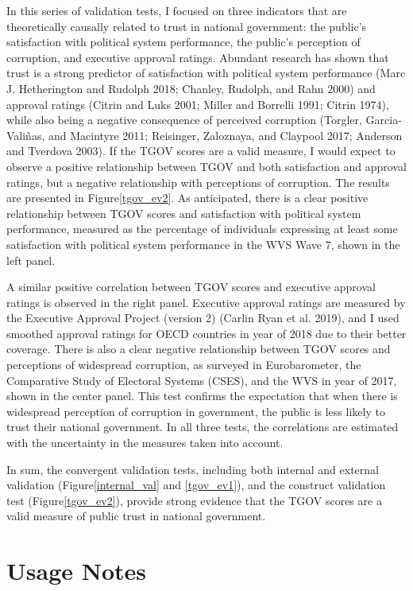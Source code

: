 \documentclass[
  12pt,
]{article}
\begin{document}
In this series of validation tests, I focused on three indicators that are theoretically causally related to trust in national government: the public's satisfaction with political system performance, the public's perception of corruption, and executive approval ratings.
Abundant research has shown that trust is a strong predictor of satisfaction with political system performance (Marc J. Hetherington and Rudolph 2018; Chanley, Rudolph, and Rahn 2000) and approval ratings (Citrin and Luks 2001; Miller and Borrelli 1991; Citrin 1974), while also being a negative consequence of perceived corruption (Torgler, Garcia-Valiñas, and Macintyre 2011; Reisinger, Zaloznaya, and Claypool 2017; Anderson and Tverdova 2003).
If the TGOV scores are a valid measure, I would expect to observe a positive relationship between TGOV and both satisfaction and approval ratings, but a negative relationship with perceptions of corruption.
The results are presented in Figure\nobreakspace{}\ref{tgov_ev2}.
As anticipated, there is a clear positive relationship between TGOV scores and satisfaction with political system performance, measured as the percentage of individuals expressing at least some satisfaction with political system performance in the WVS Wave 7, shown in the left panel.

A similar positive correlation between TGOV scores and executive approval ratings is observed in the right panel.
Executive approval ratings are measured by the Executive Approval Project (version 2) (Carlin Ryan et al. 2019), and I used smoothed approval ratings for OECD countries in year of 2018 due to their better coverage.
There is also a clear negative relationship between TGOV scores and perceptions of widespread corruption, as surveyed in Eurobarometer, the Comparative Study of Electoral Systems (CSES), and the WVS in year of 2017, shown in the center panel.
This test confirms the expectation that when there is widespread perception of corruption in government, the public is less likely to trust their national government.
In all three tests, the correlations are estimated with the uncertainty in the measures taken into account.

In sum, the convergent validation tests, including both internal and external validation (Figure\nobreakspace{}\ref{internal_val} and \nobreakspace{}\ref{tgov_ev1}), and the construct validation test (Figure\nobreakspace{}\ref{tgov_ev2}), provide strong evidence that the TGOV scores are a valid measure of public trust in national government.

\section{Usage Notes}\label{usage-notes}
\end{document}
